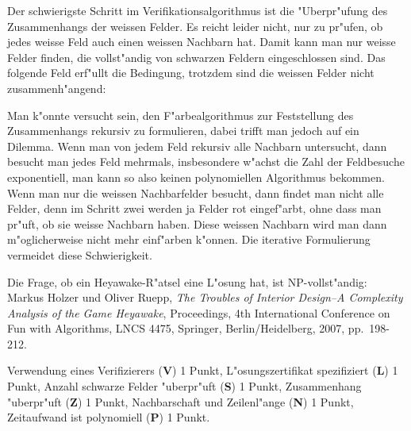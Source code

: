 \begin{diskussion}
Der schwierigste Schritt im Verifikationsalgorithmus ist die "Uberpr"ufung
des Zusammenhangs der weissen Felder.
Es reicht leider nicht, nur zu pr"ufen, ob jedes weisse Feld auch einen
weissen Nachbarn hat.
Damit kann man nur weisse Felder finden, die vollst"andig von schwarzen
Feldern eingeschlossen sind.
Das folgende Feld erf"ullt die Bedingung, trotzdem sind die weissen
Felder nicht zusammenh"angend:
\begin{center}
\end{center}

Man k"onnte versucht sein, den F"arbealgorithmus zur Feststellung des
Zusammenhangs rekursiv zu formulieren, dabei trifft man jedoch auf ein
Dilemma.
Wenn man von jedem Feld rekursiv alle Nachbarn untersucht, dann besucht
man jedes Feld mehrmals, insbesondere w"achst die Zahl der Feldbesuche
exponentiell, man kann so also keinen polynomiellen Algorithmus bekommen.
Wenn man nur die weissen Nachbarfelder besucht, dann findet man nicht
alle Felder, denn im Schritt zwei werden ja Felder rot eingef"arbt, ohne 
dass man pr"uft, ob sie weisse Nachbarn haben.
Diese weissen Nachbarn wird man dann m"oglicherweise nicht mehr einf"arben
k"onnen.
Die iterative Formulierung vermeidet diese Schwierigkeit.

Die Frage, ob ein Heyawake-R"atsel eine L"osung hat, ist NP-vollst"andig:
Markus Holzer und Oliver Ruepp, {\it The Troubles of Interior Design--A
Complexity Analysis of the Game Heyawake}, Proceedings,
4th International Conference on Fun with Algorithms, LNCS 4475, Springer,
Berlin/Heidelberg, 2007, pp.~198-212.
\end{diskussion}

\begin{bewertung}
Verwendung eines Verifizierers ({\bf V}) 1 Punkt,
L"osungszertifikat spezifiziert ({\bf L}) 1 Punkt,
Anzahl schwarze Felder "uberpr"uft ({\bf S}) 1 Punkt,
Zusammenhang "uberpr"uft ({\bf Z}) 1 Punkt,
Nachbarschaft und Zeilenl"ange ({\bf N}) 1 Punkt,
Zeitaufwand ist polynomiell ({\bf P}) 1 Punkt.
\end{bewertung}
